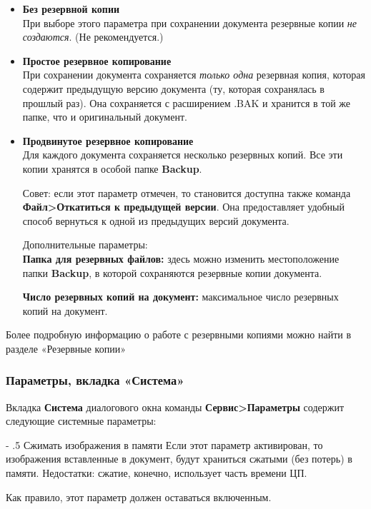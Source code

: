 ﻿\documentclass[a4paper,10pt]{article}
\makeatletter
\renewcommand\paragraph{%
   \@startsection{paragraph}{4}{0mm}%
      {-\baselineskip}%
      {.5\baselineskip}%
      {\normalfont\normalsize\bfseries}}
\makeatother
\begin{document}
 \begin{itemize}
  \item \textbf{Без резервной копии}\\
  При выборе этого параметра при сохранении документа резервные копии \textit{не создаются}. (Не рекомендуется.)
  \item \textbf{Простое резервное копирование}\\
  При сохранении документа сохраняется \textit{только одна} резервная копия, которая содержит предыдущую версию документа (ту, которая сохранялась в прошлый раз). Она сохраняется с расширением .BAK и хранится в той же папке, что и оригинальный документ.
  \item \textbf{Продвинутое резервное копирование}\\
  Для каждого документа сохраняется несколько резервных копий. Все эти копии хранятся в особой папке \textbf{Backup}.
  
  Совет: если этот параметр отмечен, то становится доступна также команда \textbf{Файл>Откатиться к предыдущей версии}. Она предоставляет удобный способ вернуться к одной из предыдущих версий документа.
  
  Дополнительные параметры:\\
\textbf{Папка для резервных файлов:} здесь можно изменить местоположение папки \textbf{Backup}, в которой сохраняются резервные копии документа.

\textbf{Число резервных копий на документ:} максимальное число резервных копий на документ.
 \end{itemize}

 Более подробную информацию о работе с резервными копиями можно найти в разделе «Резервные копии»
 
 \subsubsection{Параметры, вкладка «Система»}
 Вкладка \textbf{Система} диалогового окна команды \textbf{Сервис>Параметры} содержит следующие системные параметры:
 
 \paragraph{Сжимать изображения в памяти}
 Если этот параметр активирован, то изображения вставленные в документ, будут храниться сжатыми (без потерь) в памяти. Недостатки: сжатие, конечно, использует часть времени ЦП.
 
 Как правило, этот параметр должен оставаться включенным.
 
\end{document}

